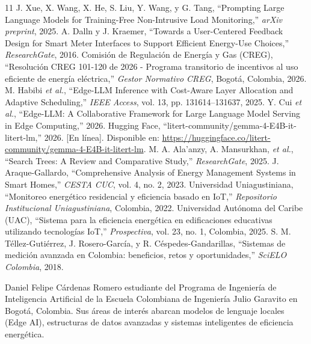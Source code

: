\documentclass[10pt,journal,compsoc]{IEEEtran}
\begin{document}
\begin{thebibliography}{11}
 J. Xue, X. Wang, X. He, S. Liu, Y. Wang, y G. Tang, ``Prompting Large Language Models for Training-Free Non-Intrusive Load Monitoring,'' \emph{arXiv preprint}, 2025.
 A. Dalln y J. Kraemer, ``Towards a User-Centered Feedback Design for Smart Meter Interfaces to Support Efficient Energy-Use Choices,'' \emph{ResearchGate}, 2016.
 Comisión de Regulación de Energía y Gas (CREG), ``Resolución CREG 101-120 de 2026 - Programa transitorio de incentivos al uso eficiente de energía eléctrica,'' \emph{Gestor Normativo CREG}, Bogotá, Colombia, 2026.
 M. Habibi \emph{et al.}, ``Edge-LLM Inference with Cost-Aware Layer Allocation and Adaptive Scheduling,'' \emph{IEEE Access}, vol. 13, pp. 131614--131637, 2025.
 Y. Cui \emph{et al.}, ``Edge-LLM: A Collaborative Framework for Large Language Model Serving in Edge Computing,'' 2026.
 Hugging Face, ``litert-community/gemma-4-E4B-it-litert-lm,'' 2026. [En línea]. Disponible en: \url{https://huggingface.co/litert-community/gemma-4-E4B-it-litert-lm}.
 M. A. Ala'anzy, A. Mansurkhan, \emph{et al.}, ``Search Trees: A Review and Comparative Study,'' \emph{ResearchGate}, 2025.
 J. Araque-Gallardo, ``Comprehensive Analysis of Energy Management Systems in Smart Homes,'' \emph{CESTA CUC}, vol. 4, no. 2, 2023.
 Universidad Uniagustiniana, ``Monitoreo energético residencial y eficiencia basado en IoT,'' \emph{Repositorio Institucional Uniagustiniana}, Colombia, 2022.
 Universidad Autónoma del Caribe (UAC), ``Sistema para la eficiencia energética en edificaciones educativas utilizando tecnologías IoT,'' \emph{Prospectiva}, vol. 23, no. 1, Colombia, 2025.
 S. M. Téllez-Gutiérrez, J. Rosero-García, y R. Céspedes-Gandarillas, ``Sistemas de medición avanzada en Colombia: beneficios, retos y oportunidades,'' \emph{SciELO Colombia}, 2018.
\end{thebibliography}

\begin{IEEEbiographynophoto}{Daniel Felipe Cárdenas Romero}
estudiante del Programa de Ingeniería de Inteligencia Artificial de la Escuela Colombiana de Ingeniería Julio Garavito en Bogotá, Colombia. Sus áreas de interés abarcan modelos de lenguaje locales (Edge AI), estructuras de datos avanzadas y sistemas inteligentes de eficiencia energética.
\end{IEEEbiographynophoto}
\end{document}
